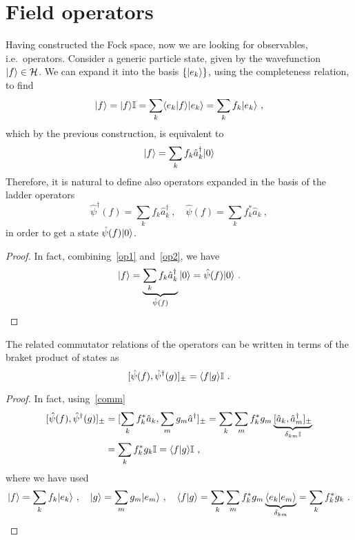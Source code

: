 \section{Field operators} 

    Having constructed the Fock space, now we are looking for observables, i.e.~operators. 
    Consider a generic particle state, given by the wavefunction $\vert f\rangle \in \mathcal H$. We can expand it into the basis $\{\vert e_k\rangle\}$, using the completeness relation, to find 
    \begin{equation*}
        \vert f\rangle = \vert f\rangle \mathbb I = \sum_k \langle e_k\vert f\rangle \vert e_k\rangle = \sum_k f_k \vert e_k\rangle ~,
    \end{equation*}
    which by the previous construction, is equivalent to 
    \begin{equation}\label{op1}
        \vert f\rangle = \sum_k f_k \hat a_k^\dagger \vert0\rangle
    \end{equation}
    Therefore, it is natural to define also operators expanded in the basis of the ladder operators
    \begin{equation}\label{op2}
        \hat \psi^\dagger (f) = \sum_k f_k \hat a^\dagger_k ~, \quad \hat \psi (f) = \sum_k f_k^* \hat a_k ~,
    \end{equation}
    in order to get a state $\hat \psi (f) \vert0\rangle$. 
    \begin{proof}
        In fact, combining~\eqref{op1} and~\eqref{op2}, we have
        \begin{equation*}
            \vert f\rangle = \underbrace{\sum_k f_k \hat a_k^\dagger}_{\hat \psi(f)} \vert0\rangle = \hat \psi (f) \vert0\rangle ~.
        \end{equation*}
    \end{proof}
    The related commutator relations of the operators can be written in terms of the braket product of states as
    \begin{equation}\label{commf}
        [\hat \psi (f), \hat \psi^\dagger (g)]_\pm = \langle f\vert g\rangle\mathbb I ~.
    \end{equation}
    \begin{proof}
        In fact, using~\eqref{comm}
        \begin{equation*}
        \begin{aligned}
            [\hat \psi (f), \hat \psi^\dagger (g)]_\pm & = [\sum_k f^*_k \hat a_k, \sum_m g_m \hat a^\dagger]_\pm = \sum_k \sum_m f^*_k g_m \underbrace{[\hat a_k, \hat a^\dagger_m]_\pm}_{\delta_{km} \mathbb I} \\ & = \sum_k f^*_k g_k \mathbb I = \braket{f}{g} \mathbb I ~,
        \end{aligned}
        \end{equation*}
        where we have used 
        \begin{equation*}
            \vert f\rangle = \sum_k f_k \vert e_k\rangle ~, \quad \vert g\rangle = \sum_m g_m \vert e_m\rangle ~, \quad \langle f\vert g\rangle = \sum_k \sum_m f^*_k g_m \underbrace{\langle e_k\vert e_m\rangle}_{\delta_{km}} = \sum_k f^*_k g_k ~.
        \end{equation*}
    \end{proof}
    
